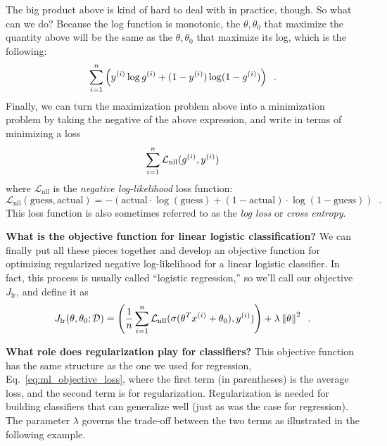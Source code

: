 The big product above is kind of hard to deal with in practice, though.
So what can we do?
Because the
log function is monotonic, the $\theta, \theta_0$ that maximize the
quantity above will be the same as the $\theta, \theta_0$ that
maximize its log, which is the following:
\begin{equation*}
  \sum_{i = 1}^n  \left( {y^{(i)}}\log {g^{(i)}} +
  (1 - y^{(i)})\log(1 - g^{(i)})\right)\;\;.
\end{equation*}
Finally, we can turn the maximization problem above into a minimization problem by taking the negative
of the above expression, and write in terms of minimizing a loss
\begin{equation*}
  \sum_{i = 1}^n \mathcal{L}_\text{nll}(g^{(i)}, y^{(i)})
\end{equation*}
where $\mathcal{L}_\text{nll}$ is the {\em negative log-likelihood}
loss function:
\begin{equation*}
  \mathcal{L}_\text{nll}(\text{guess},\text{actual}) =
  -\left(\text{actual}\cdot \log (\text{guess}) + (1 - \text{actual})\cdot\log (1 -
  \text{guess})\right) \;\;.
\end{equation*}
This loss function is also sometimes referred to as the {\em log loss}
or {\em cross entropy}. 

{\bf What is the objective function for linear logistic classification?}
We can finally put all these pieces together and develop an objective
function for optimizing regularized negative log-likelihood for a
linear logistic classifier.   In
fact, this process is usually called ``logistic regression,'' so
we'll call our objective $J_\text{lr}$, and define it as
\begin{equation}
  J_\text{lr}(\theta, \theta_0; {\cal D}) =
  \left(\frac{1}{n} \sum_{i=1}^n
  \mathcal{L}_\text{nll}(\sigma(\theta^T x^{(i)} + \theta_0), y^{(i)})\right) +
  \lambda \left\lVert\theta\right\rVert^2\;\;.
  \label{eq:lr_with_reg}
\end{equation}


{\bf What role does regularization play for classifiers?}
This objective function has the same structure as the one we used for
regression, Eq.~\ref{eq:ml_objective_loss}, where the first term (in
parentheses) is the average loss, and the second term is for regularization.
Regularization is needed for building classifiers that can generalize
well (just as was the case for regression).  The parameter $\lambda$ governs
the trade-off between the two terms as illustrated in the following example.


